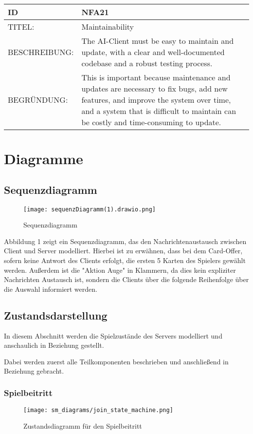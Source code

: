 \documentclass{uulm-assignment}
\begin{document}
    \begin{tabularx}{\textwidth}{|l|X |} \hline
        \textbf{ID} & \textbf{NFA21} \\
        \hline
        TITEL: & Maintainability \\
        \hline
        BESCHREIBUNG: &   The AI-Client must be easy to maintain and update, with a clear and well-documented codebase and a robust testing process.\\
        \hline
        BEGRÜNDUNG: & This is important because maintenance and updates are necessary to fix bugs, add new features, and improve the system over time, and a system that is difficult to maintain can be costly and time-consuming to update. \\
        \hline
    \end{tabularx}

    \section{Diagramme}

    \subsection{Sequenzdiagramm}
        \begin{figure}[H]
            \centering
            \texttt{[image: sequenzDiagramm(1).drawio.png]}
            \caption{Sequenzdiagramm}
        \end{figure}

        Abbildung 1 zeigt ein Sequenzdiagramm, das den Nachrichtenaustausch zwischen Client und Server modelliert. Hierbei ist zu erwähnen, dass bei dem Card-Offer, sofern keine Antwort des Clients erfolgt, die ersten 5 Karten des Spielers gewählt werden. Außerdem ist die "Aktion Auge" in Klammern, da dies kein expliziter Nachrichten Austausch ist, sondern die Clients über die folgende Reihenfolge über die Auswahl informiert werden.

    \subsection{Zustandsdarstellung}
    In diesem Abschnitt werden die Spielzustände des Servers modelliert und anschaulich in Beziehung gestellt.

    Dabei werden zuerst alle Teilkomponenten beschrieben und anschließend in Beziehung gebracht.

    \subsubsection{Spielbeitritt}
        \begin{figure}[ht]
            \centering
            \texttt{[image: sm\_diagrams/join\_state\_machine.png]}
            \caption{Zustandsdiagramm für den Spielbeitritt}
            \label{join-sm-diagram}
        \end{figure}
        
\end{document}
